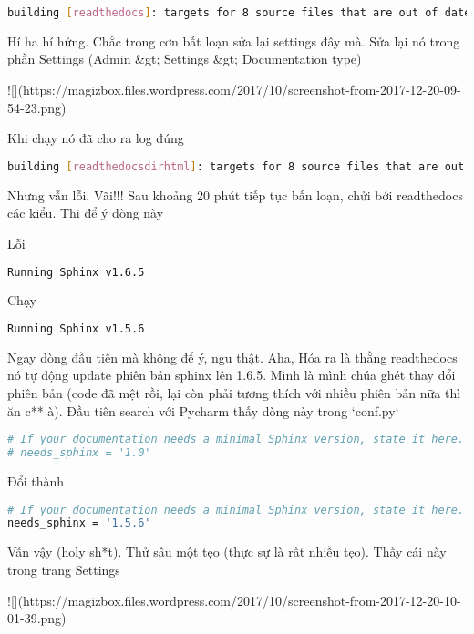\begin{lstlisting}[language=bash]
building [readthedocs]: targets for 8 source files that are out of date
\end{lstlisting}

Hí ha hí hửng. Chắc trong cơn bất loạn sửa lại settings đây mà. Sửa lại nó trong phần Settings (Admin &gt; Settings &gt; Documentation type)

![](https://magizbox.files.wordpress.com/2017/10/screenshot-from-2017-12-20-09-54-23.png)

Khi chạy nó đã cho ra log đúng

\begin{lstlisting}[language=bash]
building [readthedocsdirhtml]: targets for 8 source files that are out of date
\end{lstlisting}

Nhưng vẫn lỗi. Vãi!!! Sau khoảng 20 phút tiếp tục bấn loạn, chửi bới readthedocs các kiểu. Thì để ý dòng này

Lỗi

\begin{lstlisting}[language=bash]
Running Sphinx v1.6.5
\end{lstlisting}


Chạy

\begin{lstlisting}[language=bash]
Running Sphinx v1.5.6
\end{lstlisting}

Ngay dòng đầu tiên mà không để ý, ngu thật. Aha, Hóa ra là thằng readthedocs nó tự động update phiên bản sphinx lên 1.6.5. Mình là mình chúa ghét thay đổi phiên bản (code đã mệt rồi, lại còn phải tương thích với nhiều phiên bản nữa thì ăn c** à). Đầu tiên search với Pycharm thấy dòng này trong `conf.py`

\begin{lstlisting}[language=bash]
# If your documentation needs a minimal Sphinx version, state it here.
# needs_sphinx = '1.0'
\end{lstlisting}

Đổi thành

\begin{lstlisting}[language=bash]
# If your documentation needs a minimal Sphinx version, state it here.
needs_sphinx = '1.5.6'
\end{lstlisting}

Vẫn vậy (holy sh*t). Thử sâu một tẹo (thực sự là rất nhiều tẹo). Thấy cái này trong trang Settings

![](https://magizbox.files.wordpress.com/2017/10/screenshot-from-2017-12-20-10-01-39.png)

